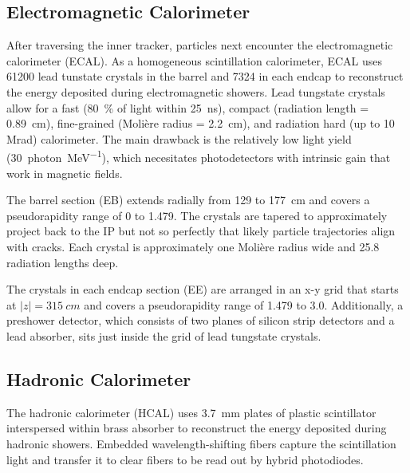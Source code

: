 \documentclass[12pt]{article}
\begin{document}
    \subsection{Electromagnetic Calorimeter}
        After traversing the inner tracker, particles next encounter the electromagnetic calorimeter (ECAL). As a homogeneous scintillation calorimeter, ECAL uses \num{61200} lead tunstate crystals in the barrel and \num{7324} in each endcap to reconstruct the energy deposited during electromagnetic showers. Lead tungstate crystals allow for a fast (\SI{80}{\percent} of light within \SI{25}{ns}), compact (radiation length = \SI{0.89}{cm}), fine-grained (Moli\`ere radius = \SI{2.2}{cm}), and radiation hard (up to 10 Mrad) calorimeter. The main drawback is the relatively low light yield (\SI{30}{photon\per\mega\electronvolt}), which necesitates photodetectors with intrinsic gain that work in magnetic fields\cite{cms_experiment, cms_tdr}.

        The barrel section (EB) extends radially from \num{129} to \SI{177}{cm} and covers a pseudorapidity range of \num{0} to \num{1.479}. The crystals are tapered to approximately project back to the IP but not so perfectly that likely particle trajectories align with cracks. Each crystal is approximately one Moli\`ere radius wide and 25.8 radiation lengths deep.

        The crystals in each endcap section (EE) are arranged in an x-y grid that starts at $\lvert z \rvert = \SI{315}{cm}$ and covers a pseudorapidity range of \num{1.479} to \num{3.0}. Additionally, a preshower detector, which consists of two planes of silicon strip detectors and a lead absorber, sits just inside the grid of lead tungstate crystals. 

    \subsection{Hadronic Calorimeter}
        The hadronic calorimeter (HCAL) uses \SI{3.7}{mm} plates of plastic scintillator interspersed within brass absorber to reconstruct the energy deposited during hadronic showers. Embedded wavelength-shifting fibers capture the scintillation light and transfer it to clear fibers to be read out by hybrid photodiodes\cite{cms_experiment, cms_tdr}.
\end{document}
